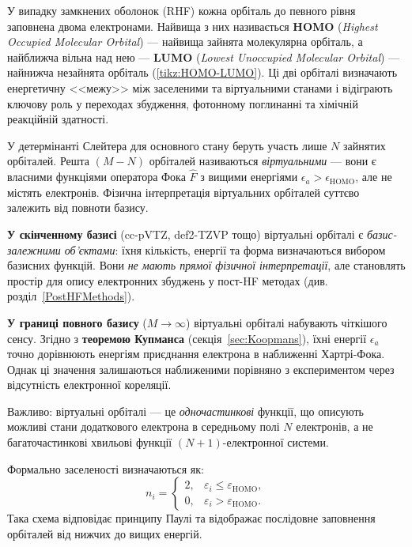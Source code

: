У випадку замкнених оболонок (RHF) кожна орбіталь до певного рівня заповнена двома електронами. Найвища з них називається \textbf{HOMO} (\emph{Highest Occupied Molecular Orbital}) --- найвища зайнята молекулярна орбіталь, а найближча вільна над нею --- \textbf{LUMO} (\emph{Lowest Unoccupied Molecular Orbital}) --- найнижча незайнята орбіталь (\ref{tikz:HOMO-LUMO}). Ці дві орбіталі визначають енергетичну <<межу>> між заселеними та віртуальними станами і відіграють ключову роль у переходах збудження, фотонному поглинанні та хімічній реакційній здатності.

\begin{commentbox}
У детермінанті Слейтера для основного стану беруть участь лише $N$ зайнятих орбіталей. Решта $(M-N)$ орбіталей називаються \emph{віртуальними} --- вони є власними функціями оператора Фока $\hat{F}$ з вищими енергіями $\epsilon_a > \epsilon_{\text{HOMO}}$, але не містять електронів. Фізична інтерпретація віртуальних орбіталей суттєво залежить від повноти базису.

\textbf{У скінченному базисі} (cc-pVTZ, def2-TZVP тощо) віртуальні орбіталі є \emph{базис-залежними об'єктами}: їхня кількість, енергії та форма визначаються вибором базисних функцій. Вони \emph{не мають прямої фізичної інтерпретації}, але становлять простір для опису електронних збуджень у пост-HF методах (див. розділ~\ref{PostHFMethods}).

\textbf{У границі повного базису} ($M \to \infty$) віртуальні орбіталі набувають чіткішого сенсу. Згідно з \textbf{теоремою Купманса} (секція~\ref{sec:Koopmans}), їхні енергії $\epsilon_a$ точно дорівнюють енергіям приєднання електрона в наближенні Хартрі-Фока. Однак ці значення залишаються наближеними порівняно з експериментом через відсутність електронної кореляції.

Важливо: віртуальні орбіталі --- це \emph{одночастинкові} функції, що описують можливі стани додаткового електрона в середньому полі $N$ електронів, а не багаточастинкові хвильові функції $(N+1)$-електронної системи.
\end{commentbox}

Формально заселеності визначаються як:
\[
n_i =
\begin{cases}
2, & \varepsilon_i \le \varepsilon_\mathrm{HOMO},\\
0, & \varepsilon_i > \varepsilon_\mathrm{HOMO}.
\end{cases}
\]
Така схема відповідає принципу Паулі та відображає послідовне заповнення орбіталей
від нижчих до вищих енергій.

